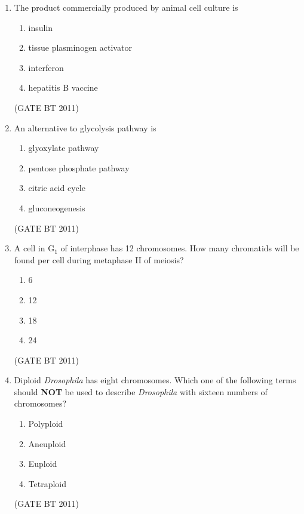 \documentclass[journal,12pt,onecolumn]{IEEEtran}
\begin{document}
\begin{enumerate}
    \item The product commercially produced by animal cell culture is
    \begin{multicols}{2}
    \begin{enumerate}
        \item insulin
        \item tissue plasminogen activator
        \item interferon
        \item hepatitis B vaccine
    \end{enumerate}
    \end{multicols} \hfill(GATE BT 2011)

    \item An alternative to glycolysis pathway is
    \begin{multicols}{2}
    \begin{enumerate}
        \item glyoxylate pathway
        \item pentose phosphate pathway
        \item citric acid cycle
        \item gluconeogenesis
    \end{enumerate}
    \end{multicols} \hfill(GATE BT 2011)

    \item A cell in G$_1$ of interphase has 12 chromosomes. How many chromatids will be found per cell during metaphase II of meiosis?
    \begin{multicols}{2}
    \begin{enumerate}
        \item 6
        \item 12
        \item 18
        \item 24
    \end{enumerate}
    \end{multicols} \hfill(GATE BT 2011)

    \item Diploid \textit{Drosophila} has eight chromosomes. Which one of the following terms should \textbf{NOT} be used to describe \textit{Drosophila} with sixteen numbers of chromosomes?
    \begin{multicols}{2}
    \begin{enumerate}
        \item Polyploid
        \item Aneuploid
        \item Euploid
        \item Tetraploid
    \end{enumerate}
    \end{multicols} \hfill(GATE BT 2011)


\end{enumerate}
\end{document}

